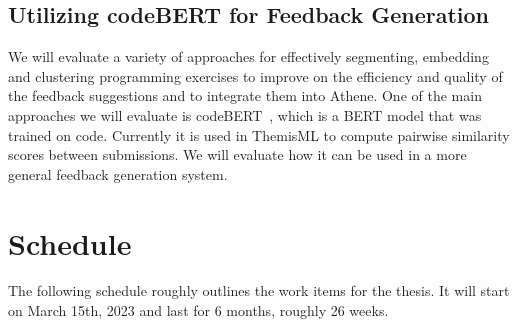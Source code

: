 \subsection*{Utilizing codeBERT for Feedback Generation}
We will evaluate a variety of approaches for effectively segmenting, embedding and clustering programming exercises to improve on the efficiency and quality of the feedback suggestions and to integrate them into Athene.
One of the main approaches we will evaluate is codeBERT~\cite{codeBERT}, which is a BERT model that was trained on code. Currently it is used in ThemisML to compute pairwise similarity scores between submissions. We will evaluate how it can be used in a more general feedback generation system.


\section*{Schedule}

The following schedule roughly outlines the work items for the thesis. It will start on March 15th, 2023 and last for 6 months, roughly 26 weeks.

